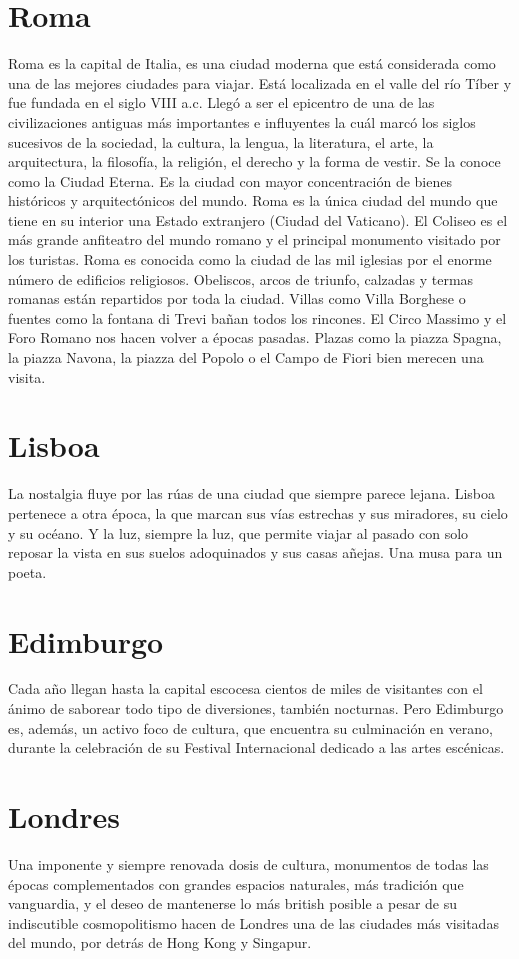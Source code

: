\documentclass[10pt,letterpaper,oneside]{book}
\begin{document}
		\section{Roma}
			Roma es la capital de Italia, es una ciudad moderna que está considerada como una de las mejores ciudades para viajar. Está localizada en el valle del río Tíber y fue fundada en el siglo VIII a.c. Llegó a ser el epicentro de una de las civilizaciones antiguas más importantes e influyentes la cuál marcó los siglos sucesivos de la sociedad, la cultura, la lengua, la literatura, el arte, la arquitectura, la filosofía, la religión, el derecho y la forma de vestir. Se la conoce como la Ciudad Eterna. Es la ciudad con mayor concentración de bienes históricos y arquitectónicos del mundo. Roma es la única ciudad del mundo que tiene en su interior una Estado extranjero (Ciudad del Vaticano). El Coliseo es el más grande anfiteatro del mundo romano y el principal monumento visitado por los turistas. Roma es conocida como la ciudad de las mil iglesias por el enorme número de edificios religiosos. Obeliscos, arcos de triunfo, calzadas y termas romanas están repartidos por toda la ciudad. Villas como Villa Borghese o fuentes como la fontana di Trevi bañan todos los rincones. El Circo Massimo y el Foro Romano nos hacen volver a épocas pasadas. Plazas como la piazza Spagna, la piazza Navona, la piazza del Popolo o el Campo de Fiori bien merecen una visita.
		\section{Lisboa}
			La nostalgia fluye por las rúas de una ciudad que siempre parece lejana. Lisboa pertenece a otra época, la que marcan sus vías estrechas y sus miradores, su cielo y su océano. Y la luz, siempre la luz, que permite viajar al pasado con solo reposar la vista en sus suelos adoquinados y sus casas añejas. Una musa para un poeta.
		\section{Edimburgo}
			Cada año llegan hasta la capital escocesa cientos de miles de visitantes con el ánimo de saborear todo tipo de diversiones, también nocturnas. Pero Edimburgo es, además, un activo foco de cultura, que encuentra su culminación en verano, durante la celebración de su Festival Internacional dedicado a las artes escénicas.
		\section{Londres}
			Una imponente y siempre renovada dosis de cultura, monumentos de todas las épocas complementados con grandes espacios naturales, más tradición que vanguardia, y el deseo de mantenerse lo más british posible a pesar de su indiscutible cosmopolitismo hacen de Londres una de las ciudades más visitadas del mundo, por detrás de Hong Kong y Singapur.
\end{document}
